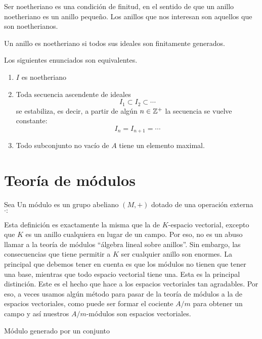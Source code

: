 \documentclass[b5paper,10pt]{book}
\begin{document}
Ser noetheriano es una condición de finitud,
en el sentido de que un anillo noetheriano
es un anillo pequeño.
Los anillos que nos interesan son aquellos 
que son noetherianos.

\begin{defi}
Un anillo es noetheriano si todos sus ideales
son finitamente generados.
\end{defi}

\begin{thm}
Los siguientes enunciados son equivalentes.
\begin{enumerate}[label=(\roman*)]
\item \(I\) es noetheriano
\item Toda secuencia ascendente de ideales 
	\[
	I_1\subset I_2\subset \cdots
	\]
	se estabiliza, es decir, a partir de algún 
	\(n\in \mathbb{Z}^+\) la secuencia se vuelve constante:
	\[
	I_n = I_{n+1} = \cdots
	\]
\item Todo subconjunto no vacío de \(A\) tiene un elemento maximal.
\end{enumerate}
\end{thm}


\chapter{Teoría de módulos}

\begin{defi}
Sea 
Un módulo es un grupo abeliano \((M,+)\) dotado de una operación externa
\(\cdot: 	\)
\end{defi}

Esta definición es exactamente la misma que la de \(K\)-espacio vectorial,
excepto que \(K\) es un anillo cualquiera en lugar de un campo.
Por eso, no es un abuso llamar a la teoría de módulos 
``álgebra lineal sobre anillos''.
Sin embargo, 
las consecuencias que tiene permitir a \(K\) ser cualquier anillo
son enormes.
La principal que debemos tener en cuenta es que 
los módulos no tienen que tener una base, mientras
que todo espacio vectorial tiene una.
Esta es la principal distinción.
Este es el hecho que hace a los espacios vectoriales tan agradables.
Por eso, a veces usamos algún método
para pasar de la teoría de módulos a la de
espacios vectoriales, como puede ser 
formar el cociente \(A/m\) para obtener un campo
y así nuestros \(A/m\)-módulos son espacios vectoriales.

\begin{defi}
Módulo generado por un conjunto
\end{defi}
\end{document}
